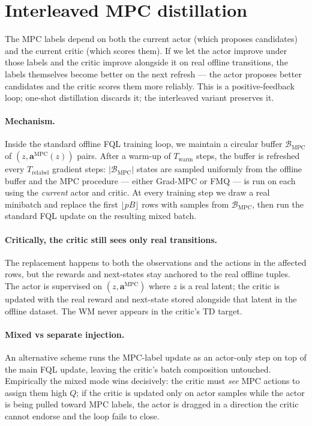 \section{Interleaved MPC distillation}
\label{sec:mpc-interleaved}

The MPC labels depend on both the current actor (which proposes
candidates) and the current critic (which scores them). If we let the
actor improve under those labels and the critic improve alongside it
on real offline transitions, the labels themselves become better on
the next refresh --- the actor proposes better candidates and the
critic scores them more reliably. This is a positive-feedback loop;
one-shot distillation discards it; the interleaved variant preserves
it.

\paragraph{Mechanism.}
Inside the standard offline FQL training loop, we maintain a circular
buffer $\mathcal{B}_{\text{MPC}}$ of $(z, \mathbf{a}^{\text{MPC}}(z))$
pairs. After a warm-up of $T_{\text{warm}}$ steps, the buffer is
refreshed every $T_{\text{relabel}}$ gradient steps:
$|\mathcal{B}_{\text{MPC}}|$ states are sampled uniformly from the
offline buffer and the MPC procedure --- either Grad-MPC or FMQ --- is
run on each using the \emph{current} actor and critic. At every
training step we draw a real minibatch and replace the first
$\lfloor pB \rfloor$ rows with samples from $\mathcal{B}_{\text{MPC}}$,
then run the standard FQL update on the resulting mixed batch.

\paragraph{Critically, the critic still sees only real transitions.}
The replacement happens to both the observations and the actions in
the affected rows, but the rewards and next-states stay anchored to
the real offline tuples. The actor is supervised on
$(z, \mathbf{a}^{\text{MPC}})$ where $z$ is a real latent; the critic
is updated with the real reward and next-state stored alongside that
latent in the offline dataset. The WM never appears in the critic's
TD target.

\paragraph{Mixed vs separate injection.}
An alternative scheme runs the MPC-label update as an actor-only step
on top of the main FQL update, leaving the critic's batch composition
untouched. Empirically the mixed mode wins decisively: the critic must
\emph{see} MPC actions to assign them high $Q$; if the critic is
updated only on actor samples while the actor is being pulled toward
MPC labels, the actor is dragged in a direction the critic cannot
endorse and the loop fails to close.

